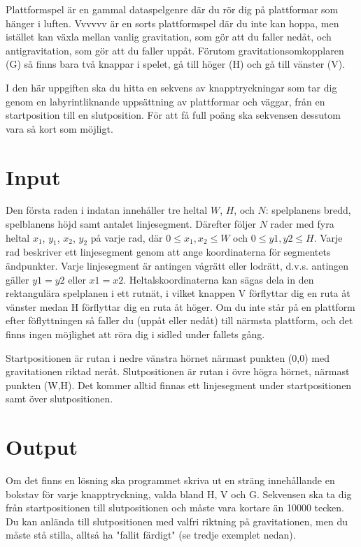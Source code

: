 

Plattformspel är en gammal dataspelgenre där du rör dig på plattformar som hänger i luften. Vvvvvv är en sorts plattformspel där du inte kan hoppa, men istället kan växla mellan vanlig gravitation, som gör att du faller nedåt, och antigravitation, som gör att du faller uppåt. Förutom gravitationsomkopplaren (G) så finns bara två knappar i spelet, gå till höger (H) och gå till vänster (V).

I den här uppgiften ska du hitta en sekvens av knapptryckningar som tar dig genom en labyrintliknande uppsättning av plattformar och väggar, från en startposition till en slutposition. För att få full poäng ska sekvensen dessutom vara så kort som möjligt.


\section*{Input}

Den första raden i indatan innehåller tre heltal $W$, $H$, och $N$: spelplanens bredd, spelblanens höjd samt antalet linjesegment. Därefter följer $N$ rader med fyra heltal $x_1$, $y_1$, $x_2$, $y_2$ på varje rad, där $0 \le x_1,x_2 \le W$ och $0 \le y1,y2 \le H$. Varje rad beskriver ett linjesegment genom att ange koordinaterna för segmentets ändpunkter. Varje linjesegment är antingen vågrätt eller lodrätt, d.v.s. antingen gäller $y1=y2$ eller $x1=x2$. Heltalskoordinaterna kan sägas dela in den rektangulära spelplanen i ett rutnät, i vilket knappen V förflyttar dig en ruta åt vänster medan H förflyttar dig en ruta åt höger. Om du inte står på en plattform efter föflyttningen så faller du (uppåt eller nedåt) till närmsta plattform, och det finns ingen möjlighet att röra dig i sidled under fallets gång.

Startpositionen är rutan i nedre vänstra hörnet närmast punkten (0,0) med gravitationen riktad neråt. Slutpositionen är rutan i övre högra hörnet, närmast punkten (W,H). Det kommer alltid finnas ett linjesegment under startpositionen samt över slutpositionen.


\section*{Output}

Om det finns en lösning ska programmet skriva ut en sträng innehållande en bokstav för varje knapptryckning, valda bland H, V och G. Sekvensen ska ta dig från startpositionen till slutpositionen och måste vara kortare än 10000 tecken. Du kan anlända till slutpositionen med valfri riktning på gravitationen, men du måste stå stilla, alltså ha "fallit färdigt" (se tredje exemplet nedan).

